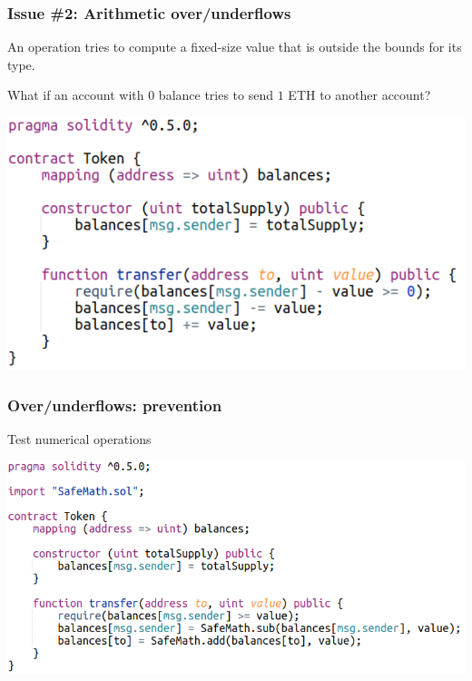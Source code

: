 \documentclass[11pt]{beamer}  %
\begin{document}
\begin{frame}\frametitle{Issue \#2: Arithmetic over/underflows}

  \begin{redbox}{}
    An operation tries to compute a fixed-size value that is outside the
    bounds for its type.
  \end{redbox}

  \bigskip

  \begin{greenbox}{What if an account with $0$ balance tries to send $1$ ETH to another account?}
    \begin{center}
      \includegraphics[scale=0.5,clip=false]{pictures/under-overflow.png}
    \end{center}
  \end{greenbox}
  
\end{frame}

\begin{frame}\frametitle{Over/underflows: prevention}

  \begin{greenbox}{Test numerical operations}
    \begin{center}
      \includegraphics[scale=0.5,clip=false]{pictures/under-overflow-fixed.png}
    \end{center}
  \end{greenbox}
    
\end{frame}
\end{document}
